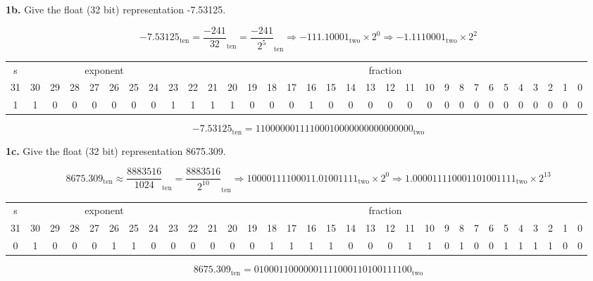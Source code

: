 \documentclass[fleqn]{article}
\begin{document}
\textbf{1b.} Give the float (32 bit) representation -7.53125.
\begin{addmargin}[0.15cm]{0cm}
\[-7.53125_{\text{ten}} = \frac{-241}{32}_{\text{ten}} = \frac{-241}{2^5}_{\text{ten}} \Rightarrow -111.10001_{\text{two}} \times 2^0 \Rightarrow -1.1110001_{\text{two}} \times 2^2 \]
\begin{table}[H]
    \setlength{\tabcolsep}{4pt}
    \fontsize{7pt}{8pt}\selectfont
    \begin{tabular}{c|cccccccc|ccccccccccccccccccccccc}
        s & \multicolumn{8}{c|}{exponent} & \multicolumn{23}{c}{fraction} \\
        31 & 30 & 29 & 28 & 27 & 26 & 25 & 24 & 23 & 22 & 21 & 20 & 19 & 18 & 17 & 16 & 15 & 14 & 13 & 12 & 11 & 10 & 9 & 8 & 7 & 6 & 5 & 4 & 3 & 2 & 1 & 0 \\
        1  & 1  & 0  & 0  &  0 &  0 &  0 &  0 &  1 &  1 & 1 & 1 & 0 & 0 & 0 & 1 & 0 & 0 & 0 & 0 & 0 & 0 & 0 & 0 & 0 & 0 & 0 & 0 & 0 & 0 & 0 & 0
    \end{tabular}
\end{table}
\vspace{-0.25in}
\[ \boxed{ -7.53125_{\text{ten}} = 1100 0000 1111 0001 0000 0000 0000 0000_{\text{two}}} \]
\end{addmargin}
\vspace{0.5in}

\textbf{1c.} Give the float (32 bit) representation 8675.309.
\begin{addmargin}[0.15cm]{0cm}
\[8675.309_{\text{ten}} \approx \frac{8883516}{1024}_{\text{ten}} = \frac{8883516}{2^{10}}_{\text{ten}} \Rightarrow 10000111100011.01001111_{\text{two}} \times 2^0 \Rightarrow 1.000011110001101001111_{\text{two}} \times 2^{13} \]
\begin{table}[H]
    \setlength{\tabcolsep}{4pt}
    \fontsize{7pt}{8pt}\selectfont
    \begin{tabular}{c|cccccccc|ccccccccccccccccccccccc}
        s & \multicolumn{8}{c|}{exponent} & \multicolumn{23}{c}{fraction} \\
        31 & 30 & 29 & 28 & 27 & 26 & 25 & 24 & 23 & 22 & 21 & 20 & 19 & 18 & 17 & 16 & 15 & 14 & 13 & 12 & 11 & 10 & 9 & 8 & 7 & 6 & 5 & 4 & 3 & 2 & 1 & 0 \\
        0  & 1  & 0  & 0  &  0 &  1 &  1 &  0 &  0 &  0 & 0  & 0  & 0  &  1 &  1 & 1  &  1 &  0 & 0  & 0  &  1 &  1 & 0 & 1 & 0 & 0 & 1 & 1 & 1 & 1 & 0 & 0
    \end{tabular}
\end{table}
\vspace{-0.25in}
\[ \boxed{8675.309_{\text{ten}} = 0100 0110 0000 0111 1000 1101 0011 1100_{\text{two}}} \]
\end{addmargin}
\end{document}
